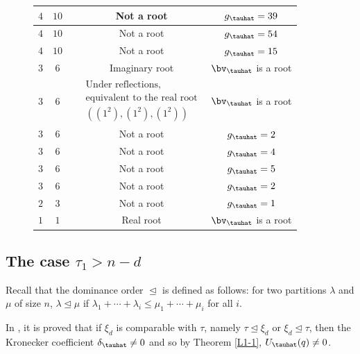 \begin{figure}[H]
\begin{tabular}{|c|c|c|c|c|}
		\hline
		$4$&$10$ & \makecell{$\substack{  (6,2^2) }$} &
		Not a root & $g_\tauhat=39$\\
		\hline
		$4$&$10$ & \makecell{$\substack{ (6,3,1) }$} &
		Not a root & $g_\tauhat=54$\\
		\hline
		$4$&$10$ & \makecell{$\substack{(6,4)}$} &
		Not a root & $g_\tauhat=15$\\
		\hline\hline
		$3$&$6$ & \makecell{$\substack{\tau_1=1,2\ \text{except}\ (2^2,1^2), (2^3)}$} &
		Imaginary root &$\bv_\tauhat$ is a root \\
		\hline
		$3$&$6$ & \makecell{$\substack{(2^2,1^2)}$} &
		$\substack{\text{Under reflections,}\\ \text{equivalent to the real root} \\ ((1^2),(1^2),(1^2)) }$ &$\bv_\tauhat$ is a root \\
		\hline
		$3$&$6$ & \makecell{$\substack{(2^3)}$} &
		Not a root &$g_\tauhat=2$ \\
		\hline
		$3$&$6$ & \makecell{$\substack{(3,1^3)}$} &
		Not a root &$g_\tauhat=4$\\
		\hline
		$3$&$6$ & \makecell{$\substack{(3,2,1)}$} &
		Not a root &$g_\tauhat=5$\\
		\hline
		$3$&$6$ & \makecell{$\substack{(3^2)}$} &
		Not a root &$g_\tauhat=2$\\
		\hline\hline
		$2$&$3$ & \makecell{$\substack{(1^3)}$} &
		Not a root &$g_\tauhat=1$\\
		\hline\hline
		$1$&$1$ & \makecell{$\substack{(1)}$} &
		Real root &$\bv_\tauhat$ is a root \\
		\hline
	\end{tabular}
\end{figure}


\subsection{The case \texorpdfstring{$\tau_1>n-d$}{tau\_1 > n-d}}

Recall that the dominance order  $\trianglelefteq$ is defined as follows: for two partitions $\lambda$ and $\mu$ of size $n$, $\lambda \trianglelefteq \mu$ if $\lambda_1+\cdots +\lambda_i \leq \mu_1+\cdots +\mu_i$ for all $i$.



In \cite{Ik}, it is proved that if $\xi_d$ is comparable with $\tau$, namely $\tau \trianglelefteq \xi_d$ or $\xi_d \trianglelefteq \tau$, then the Kronecker coefficient $\delta_\tauhat \neq 0$ and so by Theorem \ref{L1-1}, $U_\tauhat(q)\neq 0$.  


